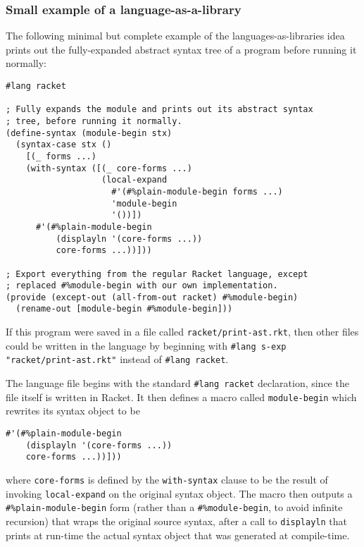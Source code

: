 \documentclass{article}
\begin{document}
\subsubsection{Small example of a language-as-a-library}
The following minimal but complete example of the languages-as-libraries idea prints out the fully-expanded abstract syntax tree of a program before running it normally:

\begin{lstlisting}
#lang racket

; Fully expands the module and prints out its abstract syntax
; tree, before running it normally.
(define-syntax (module-begin stx)
  (syntax-case stx ()
    [(_ forms ...)
    (with-syntax ([(_ core-forms ...)
                   (local-expand
                     #'(#%plain-module-begin forms ...)
                     'module-begin
                     '())])
      #'(#%plain-module-begin
          (displayln '(core-forms ...))
          core-forms ...))]))

; Export everything from the regular Racket language, except
; replaced #%module-begin with our own implementation.
(provide (except-out (all-from-out racket) #%module-begin)
  (rename-out [module-begin #%module-begin]))
\end{lstlisting}

If this program were saved in a file called \texttt{racket/print-ast.rkt}, then other files could be written in the language by beginning with \texttt{\#lang s-exp "racket/print-ast.rkt"} instead of \texttt{\#lang racket}.

The language file begins with the standard \texttt{\#lang racket} declaration, since the file itself is written in Racket. It then defines a macro called \texttt{module-begin} which rewrites its syntax object to be

\begin{lstlisting}
#'(#%plain-module-begin
    (displayln '(core-forms ...))
    core-forms ...))]))
\end{lstlisting}

where \texttt{core-forms} is defined by the \texttt{with-syntax} clause to be the result of invoking \texttt{local-expand} on the original syntax object. The macro then outputs a \texttt{\#\%plain-module-begin} form (rather than a \texttt{\#\%module-begin}, to avoid infinite recursion) that wraps the original source syntax, after a call to \texttt{displayln} that prints at run-time the actual syntax object that was generated at compile-time.
\end{document}
